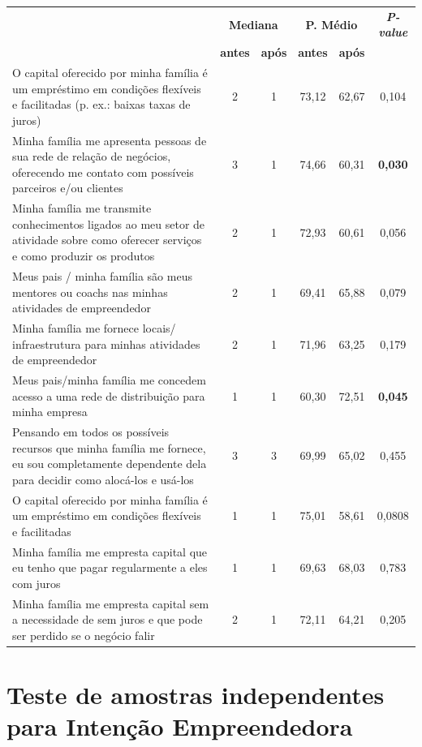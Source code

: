 \begin{apendicesenv}
\begin{longtable}[!h]{p{7cm}ccccc}
\endlastfoot
%
\multicolumn{1}{c}{\textbf{Teste de amostras independentes}} &
  \multicolumn{2}{c}{\textbf{Mediana}} &
  \multicolumn{2}{c}{\textbf{P. Médio}} &
  \multicolumn{1}{c}{\textbf{\textit{P-value}}} \\ \cline{2-5}
 &
  \textbf{antes} &
  \multicolumn{1}{l}{\textbf{após}} &
  \textbf{antes} &
  \textbf{após} &
  \multicolumn{1}{l}{} \\ \hline
O capital oferecido por minha família é um empréstimo em condições flexíveis e facilitadas (p. ex.: baixas taxas de juros) &
  2 &
  1 &
  73,12 &
  62,67 &
    0,104 \\
Minha família me apresenta pessoas de sua rede de relação de negócios, oferecendo me contato com possíveis parceiros e/ou clientes &
  3 &
  1 &
  74,66 &
  60,31 &
 \textbf{0,030} \\
Minha família me transmite conhecimentos ligados ao meu setor de atividade sobre como oferecer serviços e como produzir os produtos &
  2 &
  1 &
  72,93 &
  60,61 &
  0,056 \\
Meus pais / minha família são meus mentores ou coachs nas minhas atividades de empreendedor &
  2 &
  1 &
  69,41 &
  65,88 &
  0,079 \\
Minha família me fornece locais/ infraestrutura para minhas atividades de empreendedor &
  2 &
  1 &
  71,96 &
  63,25 &
  0,179 \\
Meus pais/minha família me concedem acesso a uma rede de distribuição para minha empresa &
  1 &
  1 &
  60,30 &
  72,51 &
  \textbf{0,045} \\
Pensando em todos os possíveis recursos que minha família me fornece, eu sou completamente dependente dela para decidir como alocá-los e usá-los &
  3 &
  3 &
  69,99 &
  65,02 &
  0,455 \\
O capital oferecido por minha família é um empréstimo em condições flexíveis e facilitadas &
  1 &
  1 &
  75,01 &
  58,61 &
  0,0808 \\
Minha família me empresta capital que eu tenho que pagar regularmente a eles com juros &
  1 &
  1 &
  69,63 &
  68,03 &
  0,783 \\
Minha família me empresta capital sem a necessidade de sem juros e que pode ser perdido se o negócio falir &
  2 &
  1 &
  72,11 &
  64,21 &
  0,205  \\ \hline \hline
\end{longtable}


\chapter{Teste de amostras independentes para Intenção Empreendedora}
\label{tab:amostras_intencao_empreendedora}



\end{apendicesenv}

